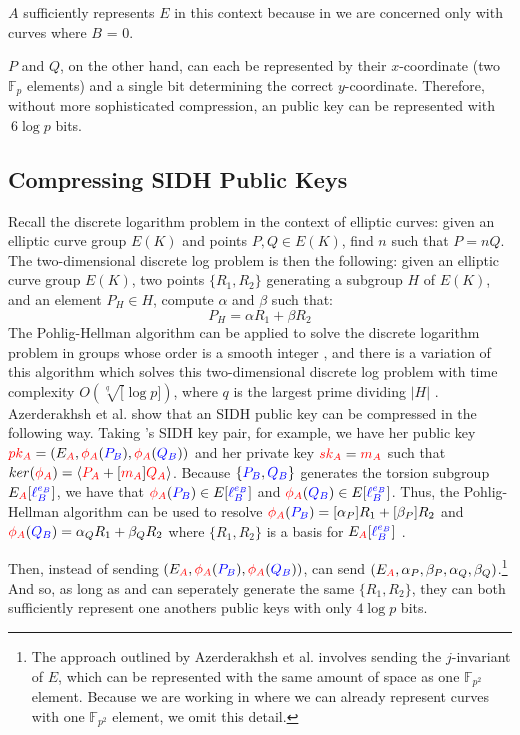 $A$ sufficiently represents $E$ in this context because in \sidh we are concerned only with curves where $B$ = 0.

$P$ and $Q$, on the other hand, can each be represented by their $x$-coordinate (two $\mathbb{F}_{p}$ elements) and a single bit determining the correct $y$-coordinate. Therefore, without more sophisticated compression, an \sidh public key can be represented with $~6\log p$ bits.

\subsection{Compressing SIDH Public Keys}
\label{subsec:azercompression}

Recall the discrete logarithm problem in the context of elliptic curves: given an elliptic curve group $E(K)$ and points $P, Q \in E(K)$, find $n$ such that $P = nQ$. The two-dimensional discrete log problem is then the following: given an elliptic curve group $E(K)$, two points $\{R_1, R_2\}$ generating a subgroup $H$ of $E(K)$, and an element $P_{H} \in H$, compute $\alpha$ and $\beta$ such that:
$$
P_{H} = \alpha R_1 + \beta R_2
$$
The Pohlig-Hellman algorithm can be applied to solve the discrete logarithm problem in groups whose order is a smooth integer \cite{ph}, and there is a variation of this algorithm which solves this two-dimensional discrete log problem with time complexity $O(\sqrt[q][\log p])$, where $q$ is the largest prime dividing $\vert H\vert$ \cite{genph}.\\

\noindent
Azerderakhsh et al. show that an SIDH public key can be compressed in the following way. Taking \alice's SIDH key pair, for example, we have her public key $\textcolor{red}{pk_A} = (E_{\textcolor{red}{A}}, \textcolor{red}{\phi_A}(\textcolor{blue}{P_B}),\textcolor{red}{\phi_A}(\textcolor{blue}{Q_B}))$ and her private key $\textcolor{red}{sk_A} = \textcolor{red}{m_A}$ such that $ker(\textcolor{red}{\phi_A}) = \langle \textcolor{red}{P_A} + [\textcolor{red}{m_A}]\textcolor{red}{Q_A}\rangle$. Because $\{\textcolor{blue}{P_B}, \textcolor{blue}{Q_B}\}$ generates the torsion subgroup $E
_{\textcolor{red}{A}}[\textcolor{blue}{\ell_{B}^{e_B}}]$, we have that $\textcolor{red}{\phi_A}(\textcolor{blue}{P_B}) \in E[\textcolor{blue}{\ell_{B}^{e_B}}]$ and $\textcolor{red}{\phi_A}(\textcolor{blue}{Q_B}) \in E[\textcolor{blue}{\ell_{B}^{e_B}}]$. Thus, the Pohlig-Hellman algorithm can be used to resolve $\textcolor{red}{\phi_A}(\textcolor{blue}{P_B}) = [\alpha_P] R_1 + [\beta_P] R_2$ and $\textcolor{red}{\phi_A}(\textcolor{blue}{Q_B}) = \alpha_Q R_1 + \beta_Q R_2$ where $\{R_1, R_2\}$ is a basis for $E_{\textcolor{red}{A}}[\textcolor{blue}{\ell_{B}^{e_B}}]$ \cite{compwr}.

Then, instead of sending \bob $(E_{\textcolor{red}{A}}, \textcolor{red}{\phi_A}(\textcolor{blue}{P_B}),\textcolor{red}{\phi_A}(\textcolor{blue}{Q_B}))$, \alice can send $(E_{\textcolor{red}{A}}, \alpha_P, \beta_P, \alpha_Q,\allowbreak{} \beta_Q)$.\footnote{The approach outlined by Azerderakhsh et al. involves sending the $j$-invariant of $E$, which can be represented with the same amount of space as one $\mathbb{F}_{p^2}$ element. Because we are working in \sidh where we can already represent curves with one $\mathbb{F}_{p^2}$ element, we omit this detail.} And so, as long as \alice and \bob can seperately generate the same $\{R_1, R_2\}$, they can both sufficiently represent one anothers public keys with only $4\log p$ bits.\\

